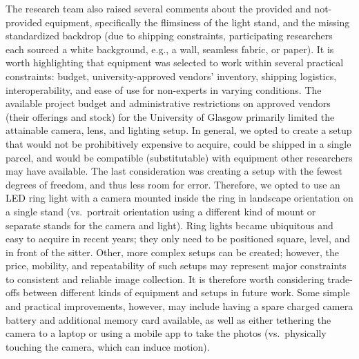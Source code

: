 \documentclass[
  letterpaper,
  DIV=11,
  numbers=noendperiod]{scrartcl}
\begin{document}
The research team also raised several comments about the provided and
not-provided equipment, specifically the flimsiness of the light stand,
and the missing standardized backdrop (due to shipping constraints,
participating researchers each sourced a white background, e.g., a wall,
seamless fabric, or paper). It is worth highlighting that equipment was
selected to work within several practical constraints: budget,
university-approved vendors' inventory, shipping logistics,
interoperability, and ease of use for non-experts in varying conditions.
The available project budget and administrative restrictions on approved
vendors (their offerings and stock) for the University of Glasgow
primarily limited the attainable camera, lens, and lighting setup. In
general, we opted to create a setup that would not be prohibitively
expensive to acquire, could be shipped in a single parcel, and would be
compatible (substitutable) with equipment other researchers may have
available. The last consideration was creating a setup with the fewest
degrees of freedom, and thus less room for error. Therefore, we opted to
use an LED ring light with a camera mounted inside the ring in landscape
orientation on a single stand (vs.~portrait orientation using a
different kind of mount or separate stands for the camera and light).
Ring lights became ubiquitous and easy to acquire in recent years; they
only need to be positioned square, level, and in front of the sitter.
Other, more complex setups can be created; however, the price, mobility,
and repeatability of such setups may represent major constraints to
consistent and reliable image collection. It is therefore worth
considering trade-offs between different kinds of equipment and setups
in future work. Some simple and practical improvements, however, may
include having a spare charged camera battery and additional memory card
available, as well as either tethering the camera to a laptop or using a
mobile app to take the photos (vs.~physically touching the camera, which
can induce motion).
\end{document}
